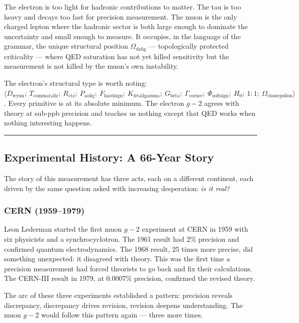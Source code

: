 \documentclass[12pt,a4paper]{article}
\begin{document}
The electron is too light for hadronic contributions to matter. The tau is too heavy and decays too fast for precision measurement. The muon is the only charged lepton where the hadronic sector is both large enough to dominate the uncertainty and small enough to measure. It occupies, in the language of the grammar, the unique structural position $\Omega_{\text{dzlig}}$ --- topologically protected criticality --- where QED saturation has not yet killed sensitivity but the measurement is not killed by the muon's own instability.

The electron's structural type is worth noting: $\langle D_{\text{wynn}};\ T_{\text{commatailz}};\ R_{\text{ctz}};\ P_{\text{aolig}};\ F_{\text{hardsign}};\ K_{\text{frtailgamma}};\ G_{\text{beta}};\ \Gamma_{\text{corner}};\ \Phi_{\text{softsign}};\ H_0;\ 1{:}1;\ \Omega_{\text{closeepsilon}} \rangle$. Every primitive is at its absolute minimum. The electron $g-2$ agrees with theory at sub-ppb precision and teaches us nothing except that QED works when nothing interesting happens.

\begin{center}
\rule{0.5\textwidth}{0.4pt}
\end{center}

\subsection{Experimental History: A 66-Year Story}

The story of this measurement has three acts, each on a different continent, each driven by the same question asked with increasing desperation: \emph{is it real?}

\subsubsection{CERN (1959--1979)}

Leon Lederman started the first muon $g-2$ experiment at CERN in 1959 with six physicists and a synchrocyclotron. The 1961 result had 2\% precision and confirmed quantum electrodynamics. The 1968 result, 25 times more precise, did something unexpected: it disagreed with theory. This was the first time a precision measurement had forced theorists to go back and fix their calculations. The CERN-III result in 1979, at 0.0007\% precision, confirmed the revised theory.

The arc of these three experiments established a pattern: precision reveals discrepancy, discrepancy drives revision, revision deepens understanding. The muon $g-2$ would follow this pattern again --- three more times.
\end{document}
